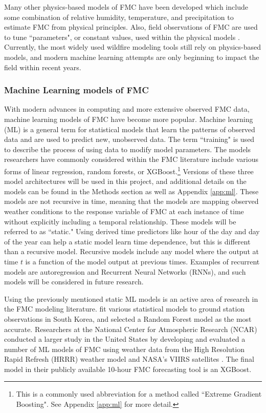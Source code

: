 \documentclass[11pt]{article}%
\begin{document}
Many other physics-based models of FMC have been developed which include some combination of relative humidity, temperature, and precipitation to estimate FMC from physical principles. Also, field observations of FMC are used to tune ``parameters", or constant values, used within the physical models \citep{Catchpole-1999-EFR,Nelson-2000-PDC, vanderKamp-2017-MFS}.  Currently, the most widely used wildfire modeling tools still rely on physics-based models, and modern machine learning attempts are only beginning to impact the field within recent years.

\subsubsection{Machine Learning models of FMC}
\hfill

With modern advances in computing and more extensive observed FMC data, machine learning models of FMC have become more popular. Machine learning (ML) is a general term for statistical models that learn the patterns of observed data and are used to predict new, unobserved data. The term ``training" is used to describe the process of using data to modify model parameters. The models researchers have commonly considered within the FMC literature include various forms of linear regression, random forests, or XGBoost.\footnote{This is a commonly used abbreviation for a method called ``Extreme Gradient Boosting". See Appendix \ref{app:ml} for more detail.} Versions of these three model architectures will be used in this project, and additional details on the models can be found in the Methods section as well as Appendix \ref{app:ml}. These models are not recursive in time, meaning that the models are mapping observed weather conditions to the response variable of FMC at each instance of time without explicitly including a temporal relationship. These models will be referred to as ``static." Using derived time predictors like hour of the day and day of the year can help a static model learn time dependence, but this is different than a recursive model. Recursive models include any model where the output at time $t$ is a function of the model output at previous times. Examples of recurrent models are autoregression and Recurrent Neural Networks (RNNs), and such models will be considered in future research.

Using the previously mentioned static ML models is an active area of research in the FMC modeling literature. \cite{Lee-2020-EFM} fit various statistical models to ground station observations in South Korea, and selected a Random Forest model as the most accurate. Researchers at the National Center for Atmospheric Research (NCAR) conducted a larger study in the United States by developing and evaluated a number of ML models of FMC using weather data from the High Resolution Rapid Refresh (HRRR) weather model and NASA's VIIRS satellites \citep{McCandless-2020-EWS, Schreck-2023-MLV}. The final model in their publicly available 10-hour FMC forecasting tool is an XGBoost. 
\end{document}
